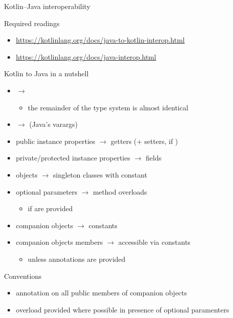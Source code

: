 \documentclass[handout]{beamer}
\begin{document}
\begin{frame}[allowframebreaks]{Kotlin--Java interoperability}
    \begin{alertblock}{Required readings}
        \begin{itemize}
            \item \url{https://kotlinlang.org/docs/java-to-kotlin-interop.html}
            \item \url{https://kotlinlang.org/docs/java-interop.html}
        \end{itemize}
    \end{alertblock}

    \begin{block}{Kotlin to Java in a nutshell}
        \begin{itemize}\small
            \item {} $\rightarrow$ 
            \begin{itemize}
                \item the remainder of the type system is almost identical
            \end{itemize}
            \item {} $\rightarrow$ \kt{\ldots} (Java's varargs)
            \item public instance properties $\rightarrow$ getters (+ setters, if )
            \item private/protected instance properties $\rightarrow$ fields
            \item objects $\rightarrow$ singleton classes with  constant
            \item optional parameters $\rightarrow$ method overloads
            \begin{itemize}
                \item if  are provided
            \end{itemize}
            \item companion objects $\rightarrow$  constants
            \item companion objects members $\rightarrow$ accessible via  constants
            \begin{itemize}
                \item unless  annotations are provided
            \end{itemize}
        \end{itemize}
    \end{block}

    \begin{exampleblock}{\twopkt{} Conventions}
        \begin{itemize}
            \item {} annotation on all public members of companion objects
            \item overload provided where possible in presence of optional paramenters
        \end{itemize}
    \end{exampleblock}
\end{frame}
\end{document}
